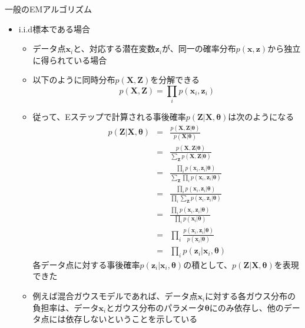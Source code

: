 \documentclass[dvipdfmx,notheorems,t]{beamer}
\begin{document}
\begin{frame}{一般のEMアルゴリズム}

\begin{itemize}
	\item \alert{i.i.d標本}である場合
	\begin{itemize}
		\item データ点$\bm{x}_i$と、対応する潜在変数$\bm{z}_i$が、同一の確率分布$p(\bm{x}, \bm{z})$から独立に得られている場合
		\item 以下のように同時分布$p(\bm{X}, \bm{Z})$を分解できる
		\begin{equation}
			p(\bm{X}, \bm{Z}) = \prod_i p(\bm{x}_i, \bm{z}_i)
		\end{equation}
		
		\item 従って、Eステップで計算される事後確率$p(\bm{Z} | \bm{X}, \bm{\theta})$は次のようになる
		\begin{eqnarray}
			p(\bm{Z} | \bm{X}, \bm{\theta}) &=& \frac{p(\bm{X}, \bm{Z} | \bm{\theta})}{p(\bm{X} | \bm{\theta})} \nonumber \\
			&=& \frac{p(\bm{X}, \bm{Z} | \bm{\theta})}{\sum_{\bm{Z}} p(\bm{X}, \bm{Z} | \bm{\theta})} \nonumber \\
			&=& \frac{\prod_i p(\bm{x}_i, \bm{z}_i | \bm{\theta})}{\sum_{\bm{Z}} \prod_i p(\bm{x}_i, \bm{z}_i | \bm{\theta})} \nonumber \\
			&=& \frac{\prod_i p(\bm{x}_i, \bm{z}_i | \bm{\theta})}{\prod_i \sum_{\bm{Z}} p(\bm{x}_i, \bm{z}_i | \bm{\theta})} \nonumber \\
			&=& \frac{\prod_i p(\bm{x}_i, \bm{z}_i | \bm{\theta})}{\prod_i p(\bm{x}_i | \bm{\theta})} \nonumber \\
			&=& \prod_i \frac{p(\bm{x}_i, \bm{z}_i | \bm{\theta})}{p(\bm{x}_i | \bm{\theta})} \nonumber \\
			&=& \prod_i p(\bm{z}_i | \bm{x}_i, \bm{\theta})
		\end{eqnarray}
		各データ点に対する事後確率$p(\bm{z}_i | \bm{x}_i, \bm{\theta})$の積として、$p(\bm{Z} | \bm{X}, \bm{\theta})$を表現できた
		
		\item 例えば混合ガウスモデルであれば、データ点$\bm{x}_i$に対する各ガウス分布の負担率は、データ$\bm{x}_i$とガウス分布のパラメータ$\bm{\theta}$にのみ依存し、他のデータ点には依存しないということを示している
	\end{itemize}
\end{itemize}

\end{frame}
\end{document}
